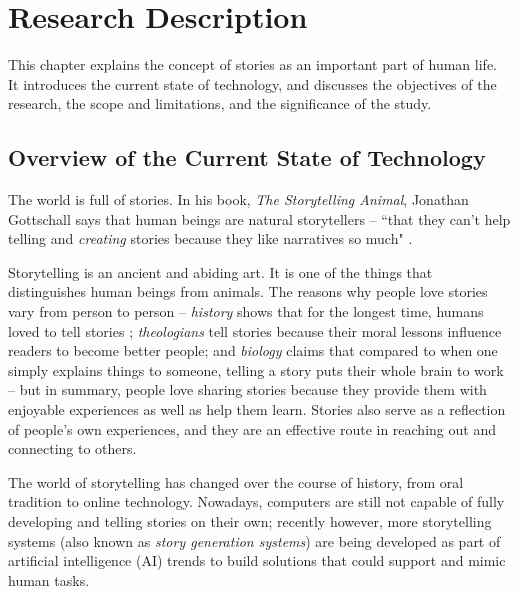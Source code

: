 %
%
%                 

\chapter{Research Description}
\label{sec:researchdesc} 

This chapter explains the concept of stories as an important part of human life. It introduces the current state of technology, and discusses the objectives of the research, the scope and limitations, and the significance of the study.

\section{Overview of the Current State of Technology}
\label{sec:overview}
The world is full of stories. In his book, \textit{The Storytelling Animal}, Jonathan Gottschall says that human beings are natural storytellers -- ``that they can't help telling and \textit{creating} stories because they like narratives so much" \cite{Gopnik2012}.

Storytelling is an ancient and abiding art. It is one of the things that distinguishes human beings from animals. The reasons why people love stories vary from person to person -- \textit{history} shows that for the longest time, humans loved to tell stories \cite{Gopnik2012}; \textit{theologians} tell stories because their moral lessons influence readers to become better people; and \textit{biology} claims that compared to when one simply explains things to someone, telling a story puts their whole brain to work \cite{Widrich2012} -- but in summary, people love sharing stories because they provide them with enjoyable experiences as well as help them learn. Stories also serve as a reflection of people's own experiences, and they are an effective route in reaching out and connecting to others.

The world of storytelling has changed over the course of history, from oral tradition to online technology. Nowadays, computers are still not capable of fully developing and telling stories on their own; recently however, more storytelling systems (also known as \textit{story generation systems}) are being developed as part of artificial intelligence (AI) trends to build solutions that could support and mimic human tasks.

